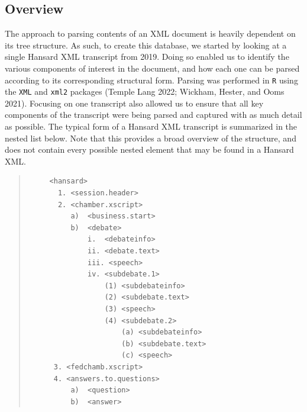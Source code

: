 \documentclass[
  letterpaper,
  DIV=11,
  numbers=noendperiod]{scrartcl}
\begin{document}
\hypertarget{sec-overview}{%
\subsection{Overview}\label{sec-overview}}

The approach to parsing contents of an XML document is heavily dependent
on its tree structure. As such, to create this database, we started by
looking at a single Hansard XML transcript from 2019. Doing so enabled
us to identify the various components of interest in the document, and
how each one can be parsed according to its corresponding structural
form. Parsing was performed in \texttt{R} using the \texttt{XML} and
\texttt{xml2} packages (Temple Lang 2022; Wickham, Hester, and Ooms
2021). Focusing on one transcript also allowed us to ensure that all key
components of the transcript were being parsed and captured with as much
detail as possible. The typical form of a Hansard XML transcript is
summarized in the nested list below. Note that this provides a broad
overview of the structure, and does not contain every possible nested
element that may be found in a Hansard XML.

\begin{quote}
\begin{verbatim}
     <hansard>
       1. <session.header>
       2. <chamber.xscript>
          a)  <business.start>
          b)  <debate>
              i.  <debateinfo>
              ii. <debate.text>
              iii. <speech>
              iv. <subdebate.1>
                  (1) <subdebateinfo>
                  (2) <subdebate.text>
                  (3) <speech>
                  (4) <subdebate.2>
                      (a) <subdebateinfo>
                      (b) <subdebate.text>
                      (c) <speech>
      3. <fedchamb.xscript>
      4. <answers.to.questions>
          a)  <question>
          b)  <answer>
\end{verbatim}
\end{quote}
\end{document}
